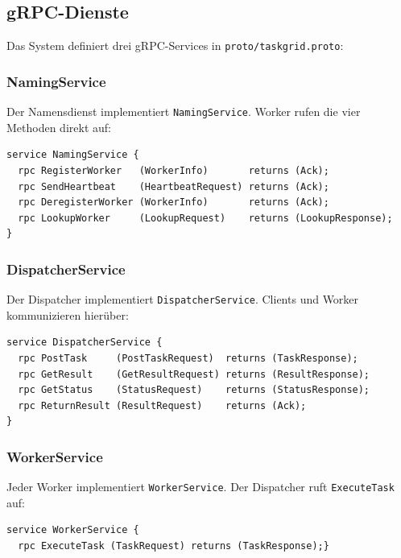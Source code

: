 \subsection{gRPC-Dienste}

Das System definiert drei gRPC-Services in \texttt{proto/taskgrid.proto}:

\subsubsection*{NamingService}

Der Namensdienst implementiert \texttt{NamingService}.
Worker rufen die vier Methoden direkt auf:
\begin{lstlisting}[language={},caption={NamingService in taskgrid.proto}]
service NamingService {
  rpc RegisterWorker   (WorkerInfo)       returns (Ack);
  rpc SendHeartbeat    (HeartbeatRequest) returns (Ack);
  rpc DeregisterWorker (WorkerInfo)       returns (Ack);
  rpc LookupWorker     (LookupRequest)    returns (LookupResponse);
}
\end{lstlisting}

\subsubsection*{DispatcherService}

Der Dispatcher implementiert \texttt{DispatcherService}.
Clients und Worker kommunizieren hierüber:

\begin{lstlisting}[language={},caption={DispatcherService in taskgrid.proto}]
service DispatcherService {
  rpc PostTask     (PostTaskRequest)  returns (TaskResponse);
  rpc GetResult    (GetResultRequest) returns (ResultResponse);
  rpc GetStatus    (StatusRequest)    returns (StatusResponse);
  rpc ReturnResult (ResultRequest)    returns (Ack);
}
\end{lstlisting}

\subsubsection*{WorkerService}

Jeder Worker implementiert \texttt{WorkerService}.
Der Dispatcher ruft \texttt{ExecuteTask} auf:

\begin{lstlisting}[language={},caption={WorkerService in taskgrid.proto}]
service WorkerService {
  rpc ExecuteTask (TaskRequest) returns (TaskResponse);}
\end{lstlisting}

